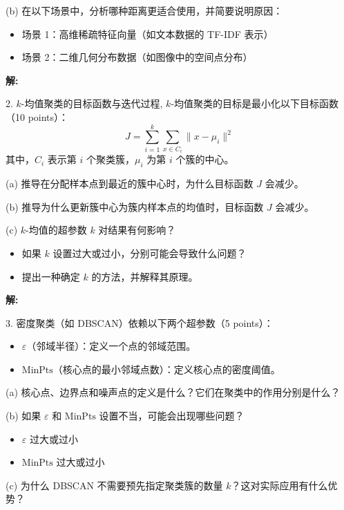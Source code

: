 \documentclass[8pt]{article}
\begin{document}
(b) 在以下场景中，分析哪种距离更适合使用，并简要说明原因：  
\begin{itemize}
    \item 场景 1：高维稀疏特征向量（如文本数据的 TF-IDF 表示）   
    \item 场景 2：二维几何分布数据（如图像中的空间点分布）  
\end{itemize}

\textbf{\large 解:}

\vspace{3em}

2. \( k \)-均值聚类的目标函数与迭代过程, \( k \)-均值聚类的目标是最小化以下目标函数（10 points）：  
\[
J = \sum_{i=1}^k \sum_{x \in C_i} \|x - \mu_i\|^2
\]  
其中，\( C_i \) 表示第 \( i \) 个聚类簇，\( \mu_i \) 为第 \( i \) 个簇的中心。  

(a) 推导在分配样本点到最近的簇中心时，为什么目标函数 \( J \) 会减少。 

(b) 推导为什么更新簇中心为簇内样本点的均值时，目标函数 \( J \) 会减少。 

(c) \( k \)-均值的超参数 \( k \) 对结果有何影响？  
\begin{itemize}
    \item  如果 \( k \) 设置过大或过小，分别可能会导致什么问题？  
    \item 提出一种确定 \( k \) 的方法，并解释其原理。  
\end{itemize}

\textbf{\large 解:}

\vspace{3em}

3. 密度聚类（如 DBSCAN）依赖以下两个超参数（5 points）：  
\begin{itemize}
    \item \( \varepsilon \)（邻域半径）：定义一个点的邻域范围。  
    \item \( \text{MinPts} \)（核心点的最小邻域点数）：定义核心点的密度阈值。 
\end{itemize}
(a) 核心点、边界点和噪声点的定义是什么？它们在聚类中的作用分别是什么？

(b) 如果 \( \varepsilon \) 和 \( \text{MinPts} \) 设置不当，可能会出现哪些问题？  
\begin{itemize}
    \item \( \varepsilon \) 过大或过小    
    \item \( \text{MinPts} \) 过大或过小  
\end{itemize}
   
(c) 为什么 DBSCAN 不需要预先指定聚类簇的数量 \( k \)？这对实际应用有什么优势？
\end{document}

